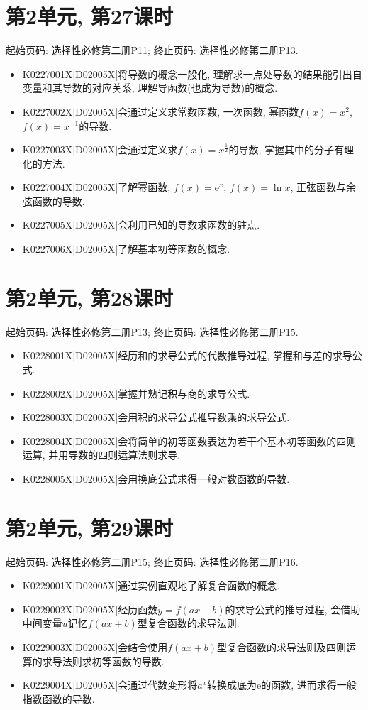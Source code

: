 \section*{第2单元, 第27课时}
起始页码: 选择性必修第二册P11; 终止页码: 选择性必修第二册P13.
\begin{itemize}
\item K0227001X|D02005X|将导数的概念一般化, 理解求一点处导数的结果能引出自变量和其导数的对应关系, 理解导函数(也成为导数)的概念.
\item K0227002X|D02005X|会通过定义求常数函数, 一次函数, 幂函数$f(x)=x^2$, $f(x)=x^{-1}$的导数.
\item K0227003X|D02005X|会通过定义求$f(x)=x^\frac 12$的导数, 掌握其中的分子有理化的方法.
\item K0227004X|D02005X|了解幂函数, $f(x)=\mathrm{e}^x$, $f(x)=\ln x$, 正弦函数与余弦函数的导数.
\item K0227005X|D02005X|会利用已知的导数求函数的驻点.
\item K0227006X|D02005X|了解基本初等函数的概念.
\end{itemize}

\section*{第2单元, 第28课时}
起始页码: 选择性必修第二册P13; 终止页码: 选择性必修第二册P15.
\begin{itemize}
\item K0228001X|D02005X|经历和的求导公式的代数推导过程, 掌握和与差的求导公式.
\item K0228002X|D02005X|掌握并熟记积与商的求导公式.
\item K0228003X|D02005X|会用积的求导公式推导数乘的求导公式.
\item K0228004X|D02005X|会将简单的初等函数表达为若干个基本初等函数的四则运算, 并用导数的四则运算法则求导.
\item K0228005X|D02005X|会用换底公式求得一般对数函数的导数.
\end{itemize}

\section*{第2单元, 第29课时}
起始页码: 选择性必修第二册P15; 终止页码: 选择性必修第二册P16.
\begin{itemize}
\item K0229001X|D02005X|通过实例直观地了解复合函数的概念.
\item K0229002X|D02005X|经历函数$y=f(ax+b)$的求导公式的推导过程, 会借助中间变量$u$记忆$f(ax+b)$型复合函数的求导法则.
\item K0229003X|D02005X|会结合使用$f(ax+b)$型复合函数的求导法则及四则运算的求导法则求初等函数的导数.
\item K0229004X|D02005X|会通过代数变形将$a^x$转换成底为$\mathrm{e}$的函数, 进而求得一般指数函数的导数.
\end{itemize}

